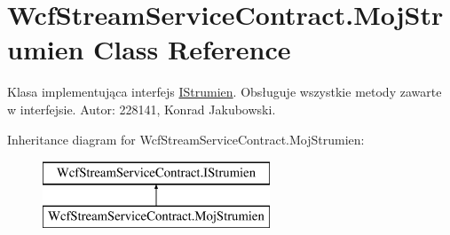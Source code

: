 \hypertarget{class_wcf_stream_service_contract_1_1_moj_strumien}{}\section{Wcf\+Stream\+Service\+Contract.\+Moj\+Strumien Class Reference}
\label{class_wcf_stream_service_contract_1_1_moj_strumien}


Klasa implementująca interfejs \textquotesingle{}\hyperlink{interface_wcf_stream_service_contract_1_1_i_strumien}{I\+Strumien}\textquotesingle{}. Obsługuje wszystkie metody zawarte w interfejsie. Autor\+: 228141, Konrad Jakubowski.  


Inheritance diagram for Wcf\+Stream\+Service\+Contract.\+Moj\+Strumien\+:\begin{figure}[H]
\begin{center}
\leavevmode
\includegraphics[height=2.000000cm]{class_wcf_stream_service_contract_1_1_moj_strumien}
\end{center}
\end{figure}
